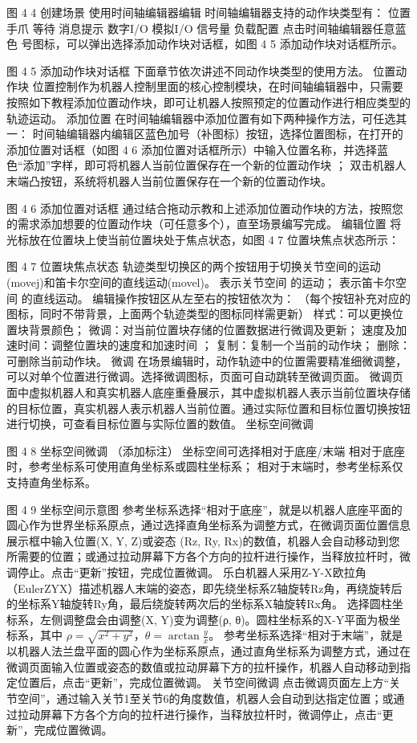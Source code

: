 图 4 4  创建场景
使用时间轴编辑器编辑
时间轴编辑器支持的动作块类型有：
位置
手爪
等待
消息提示
数字I/O
模拟I/O
信号量
负载配置
点击时间轴编辑器任意蓝色 号图标，可以弹出选择添加动作块对话框，如图 4 5 添加动作块对话框所示。

图 4 5 添加动作块对话框
下面章节依次讲述不同动作块类型的使用方法。
位置动作块
位置控制作为机器人控制里面的核心控制模块，在时间轴编辑器中，只需要按照如下教程添加位置动作块，即可让机器人按照预定的位置动作进行相应类型的轨迹运动。
添加位置
在时间轴编辑器中添加位置有如下两种操作方法，可任选其一：
时间轴编辑器内编辑区蓝色加号（补图标）按钮，选择位置图标，在打开的添加位置对话框（如图 4 6 添加位置对话框所示）中输入位置名称，并选择蓝色“添加”字样，即可将机器人当前位置保存在一个新的位置动作块 ；
双击机器人末端凸按钮，系统将机器人当前位置保存在一个新的位置动作块。

图 4 6  添加位置对话框
通过结合拖动示教和上述添加位置动作块的方法，按照您的需求添加想要的位置动作块（可任意多个），直至场景编写完成。
编辑位置
将光标放在位置块上使当前位置块处于焦点状态，如图 4 7  位置块焦点状态所示：

图 4 7  位置块焦点状态
轨迹类型切换区的两个按钮用于切换关节空间的运动(movej)和笛卡尔空间的直线运动(movel)。
 表示关节空间 的运动；
 表示笛卡尔空间 的直线运动。
编辑操作按钮区从左至右的按钮依次为：
（每个按钮补充对应的图标，同时不带背景，上面两个轨迹类型的图标同样需更新）
样式：可以更换位置块背景颜色；
微调：对当前位置块存储的位置数据进行微调及更新；
速度及加速时间：调整位置块的速度和加速时间 ；
复制：复制一个当前的动作块；
删除：可删除当前动作块。
	微调
在场景编辑时，动作轨迹中的位置需要精准细微调整，可以对单个位置进行微调。选择微调图标，页面可自动跳转至微调页面。
微调页面中虚拟机器人和真实机器人底座重叠展示，其中虚拟机器人表示当前位置块存储的目标位置，真实机器人表示机器人当前位置。通过实际位置和目标位置切换按钮 进行切换，可查看目标位置与实际位置的数值。
	坐标空间微调

图 4 8  坐标空间微调
（添加标注）
坐标空间可选择相对于底座/末端
相对于底座时，参考坐标系可使用直角坐标系或圆柱坐标系；
相对于末端时，参考坐标系仅支持直角坐标系。

图 4 9  坐标空间示意图
参考坐标系选择“相对于底座”，就是以机器人底座平面的圆心作为世界坐标系原点，通过选择直角坐标系为调整方式，在微调页面位置信息展示框中输入位置(X, Y, Z)或姿态 (Rz, Ry, Rx)的数值，机器人会自动移动到您所需要的位置；或通过拉动屏幕下方各个方向的拉杆进行操作，当释放拉杆时，微调停止。点击“更新”按钮，完成位置微调。
乐白机器人采用Z-Y-X欧拉角（EulerZYX）描述机器人末端的姿态，即先绕坐标系Z轴旋转Rz角，再绕旋转后的坐标系Y轴旋转Ry角，最后绕旋转两次后的坐标系X轴旋转Rx角。
选择圆柱坐标系，左侧调整盘会由调整(X, Y)变为调整(ρ, θ)。圆柱坐标系的X-Y平面为极坐标系，其中 $\rho=\sqrt{x^2+y^2}$，$\theta=\arctan\frac{y}{x}$。
参考坐标系选择“相对于末端”，就是以机器人法兰盘平面的圆心作为坐标系原点，通过直角坐标系为调整方式，通过在微调页面输入位置或姿态的数值或拉动屏幕下方的拉杆操作，机器人自动移动到指定位置后，点击“更新”，完成位置微调。
	关节空间微调
点击微调页面左上方“关节空间”，通过输入关节1至关节6的角度数值，机器人会自动到达指定位置；或通过拉动屏幕下方各个方向的拉杆进行操作，当释放拉杆时，微调停止，点击“更新”，完成位置微调。


